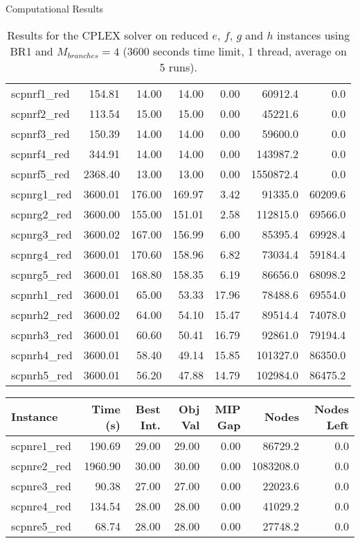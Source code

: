 \documentclass[a4paper,12pt]{mydeitesi_eng}
\begin{document}
\begin{chapter}{Computational Results}
\begin{table}[h]
\begin{center}
\begin{tabular}{l|r|r|r|r|r|r}
scpnrf1\_red & 154.81 & 14.00 & 14.00 & 0.00 & 60912.4 & 0.0 \\ 
scpnrf2\_red & 113.54 & 15.00 & 15.00 & 0.00 & 45221.6 & 0.0 \\ 
scpnrf3\_red & 150.39 & 14.00 & 14.00 & 0.00 & 59600.0 & 0.0 \\ 
scpnrf4\_red & 344.91 & 14.00 & 14.00 & 0.00 & 143987.2 & 0.0 \\ 
scpnrf5\_red & 2368.40 & 13.00 & 13.00 & 0.00 & 1550872.4 & 0.0 \\ 
\hline

scpnrg1\_red & 3600.01 & 176.00 & 169.97 & 3.42 & 91335.0 & 60209.6 \\ 
scpnrg2\_red & 3600.00 & 155.00 & 151.01 & 2.58 & 112815.0 & 69566.0 \\ 
scpnrg3\_red & 3600.02 & 167.00 & 156.99 & 6.00 & 85395.4 & 69928.4 \\ 
scpnrg4\_red & 3600.01 & 170.60 & 158.96 & 6.82 & 73034.4 & 59184.4 \\ 
scpnrg5\_red & 3600.01 & 168.80 & 158.35 & 6.19 & 86656.0 & 68098.2 \\
\hline
 
scpnrh1\_red & 3600.01 & 65.00 & 53.33 & 17.96 & 78488.6 & 69554.0 \\ 
scpnrh2\_red & 3600.02 & 64.00 & 54.10 & 15.47 & 89514.4 & 74078.0 \\ 
scpnrh3\_red & 3600.01 & 60.60 & 50.41 & 16.79 & 92861.0 & 79194.4 \\ 
scpnrh4\_red & 3600.01 & 58.40 & 49.14 & 15.85 & 101327.0 & 86350.0 \\ 
scpnrh5\_red & 3600.01 & 56.20 & 47.88 & 14.79 & 102984.0 & 86475.2 \\ 
\end{tabular}
\end{center}
\caption{Results for the CPLEX solver on reduced $e$, $f$, $g$ and $h$ instances using BR1 and $M_{branches} = 4$ (3600 seconds time limit, 1 thread, average on 5  runs).}
\label{tab:ResultBR1_M4}
\end{table}


\begin{table}[h]
\begin{center}
\begin{tabular}{l|r|r|r|r|r|r}
\textbf{Instance} & \textbf{Time (s)} & \textbf{Best Int.} & \textbf{Obj Val} & \textbf{MIP Gap} & \textbf{Nodes} & \textbf{Nodes Left}\\
\hline
scpnre1\_red & 190.69 & 29.00 & 29.00 & 0.00 & 86729.2 & 0.0\\ 
scpnre2\_red & 1960.90 & 30.00 & 30.00 & 0.00 & 1083208.0 & 0.0\\ 
scpnre3\_red & 90.38 & 27.00 & 27.00 & 0.00 & 22023.6 & 0.0\\ 
scpnre4\_red & 134.54 & 28.00 & 28.00 & 0.00 & 41029.2 & 0.0\\ 
scpnre5\_red & 68.74 & 28.00 & 28.00 & 0.00 & 27748.2 & 0.0\\
\hline


\end{tabular}
\end{center}
\end{table}
\end{chapter}
\end{document}
